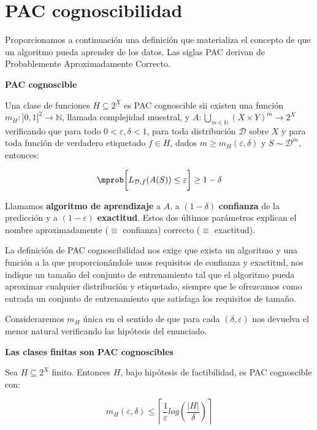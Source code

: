 \section{PAC cognoscibilidad}
Proporcionamos a continuación una definición que materializa el concepto de que un algoritmo pueda aprender de los datos. Las
siglas PAC derivan de Probablemente Aproximadamente Correcto.

\begin{definition} \textbf{PAC cognoscible}

Una clase de funciones $H \subseteq 2^X$ es PAC cognoscible sii existen una función 
$m_{H} : ]0,1[^2\rightarrow \mathbb{N}$, llamada complejidad muestral, y 
$A: \underset{m\in \mathbb{N}}{\bigcup} (X\times Y)^m \rightarrow 2^X$ verificando que para todo
$0 < \varepsilon, \delta < 1$, para toda distribución $\mathcal{D}$ sobre $X$ y para toda función de 
verdadero etiquetado $f\in H$, dados $m \ge m_H(\varepsilon, \delta)$ y $S\sim \mathcal{D}^m$, entonces:

\[\mprob \bigg[L_{\mathcal{D},f}(A(S)) \le \varepsilon \bigg] \ge 1-\delta\]

\label{def:pac}
\end{definition}

Llamamos \textbf{algoritmo de aprendizaje} a $A$, a $(1-\delta)$ \textbf{confianza} de la predicción y 
a $(1-\varepsilon)$ \textbf{exactitud}. Estos dos últimos parámetros explican el nombre aproximadamente 
($\equiv$ confianza) correcto ($\equiv$ exactitud).

La definición de PAC cognoscibilidad nos exige que exista un algoritmo y una función a la que proporcionándole unos requisitos
de confianza y exactitud, nos indique un tamaño del conjunto de entrenamiento tal que el algoritmo pueda aproximar cualquier
distribución y etiquetado, siempre que le ofrezcamos como entrada un conjunto de entrenamiento que satisfaga los 
requisitos de tamaño.

Consideraremos $m_{H}$ única en el sentido de que para cada $(\delta, \varepsilon)$ nos devuelva el menor natural
verificando las hipótesis del enunciado.

\begin{theorem} \textbf{Las clases finitas son PAC cognoscibles}

Sea $H \subseteq 2^{X}$ finito. Entonces $H$, bajo hipótesis de factibilidad, es PAC cognoscible con:

\[m_H(\varepsilon, \delta) \le \left\lceil \frac{1}{\varepsilon}log \left(\frac{|H|}{\delta} \right) \right\rceil\]
\label{th:finitas-pac}
\end{theorem}

